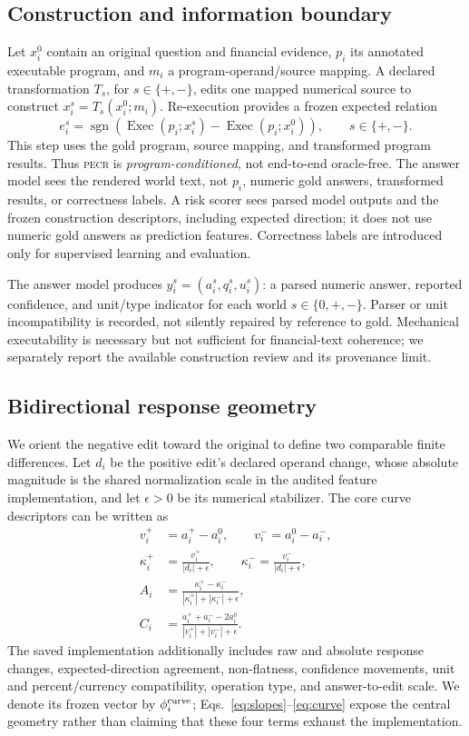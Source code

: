 \documentclass[11pt]{article}
\newcommand{\PECR}{\textsc{pecr}}
\newcommand{\sgn}{\operatorname{sgn}}
\newcommand{\Exec}{\operatorname{Exec}}
\begin{document}
\subsection{Construction and information boundary}
Let $x_i^{0}$ contain an original question and financial evidence, $p_i$ its annotated executable program, and $m_i$ a program-operand/source mapping. A declared transformation $T_s$, for $s\in\{+,-\}$, edits one mapped numerical source to construct $x_i^s=T_s(x_i^0;m_i)$. Re-execution provides a frozen expected relation
\begin{equation}
e_i^s=\sgn\!\left(\Exec(p_i;x_i^s)-\Exec(p_i;x_i^0)\right),\qquad s\in\{+,-\}.
\label{eq:expected}
\end{equation}
This step uses the gold program, source mapping, and transformed program results. Thus \PECR{} is \emph{program-conditioned}, not end-to-end oracle-free. The answer model sees the rendered world text, not $p_i$, numeric gold answers, transformed results, or correctness labels. A risk scorer sees parsed model outputs and the frozen construction descriptors, including expected direction; it does not use numeric gold answers as prediction features. Correctness labels are introduced only for supervised learning and evaluation.

The answer model produces $y_i^s=(a_i^s,q_i^s,u_i^s)$: a parsed numeric answer, reported confidence, and unit/type indicator for each world $s\in\{0,+,-\}$. Parser or unit incompatibility is recorded, not silently repaired by reference to gold. Mechanical executability is necessary but not sufficient for financial-text coherence; we separately report the available construction review and its provenance limit.

\subsection{Bidirectional response geometry}
We orient the negative edit toward the original to define two comparable finite differences. Let $d_i$ be the positive edit's declared operand change, whose absolute magnitude is the shared normalization scale in the audited feature implementation, and let $\epsilon>0$ be its numerical stabilizer. The core curve descriptors can be written as
\begin{align}
v_i^+ &= a_i^+-a_i^0,\qquad v_i^- = a_i^0-a_i^-,\nonumber\\
\kappa_i^+ &= \frac{v_i^+}{|d_i|+\epsilon},\qquad
\kappa_i^- = \frac{v_i^-}{|d_i|+\epsilon},\label{eq:slopes}\\
A_i &=\frac{\kappa_i^+-\kappa_i^-}{|\kappa_i^+|+|\kappa_i^-|+\epsilon},\\
C_i &=\frac{a_i^++a_i^- -2a_i^0}{|v_i^+|+|v_i^-|+\epsilon}.
\label{eq:curve}
\end{align}
The saved implementation additionally includes raw and absolute response changes, expected-direction agreement, non-flatness, confidence movements, unit and percent/currency compatibility, operation type, and answer-to-edit scale. We denote its frozen vector by $\phi_i^{\rm curve}$; Eqs.~\ref{eq:slopes}--\ref{eq:curve} expose the central geometry rather than claiming that these four terms exhaust the implementation.
\end{document}
